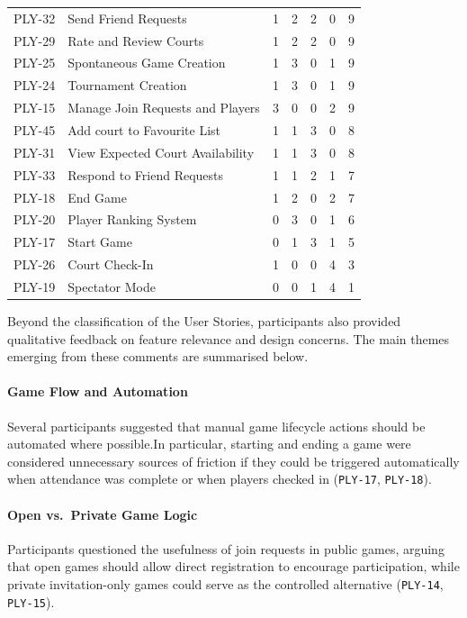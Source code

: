 \begin{table}[htbp]
{\begin{tabular}{|l|p{4.3cm}|c|c|c|c|c|}
			PLY-32 & Send Friend Requests & 1 & 2 & 2 & 0 & 9 \\
			PLY-29 & Rate and Review Courts & 1 & 2 & 2 & 0 & 9 \\
			PLY-25 & Spontaneous Game Creation & 1 & 3 & 0 & 1 & 9 \\
			PLY-24 & Tournament Creation & 1 & 3 & 0 & 1 & 9 \\
			PLY-15 & Manage Join Requests and Players & 3 & 0 & 0 & 2 & 9 \\
			PLY-45 & Add court to Favourite List & 1 & 1 & 3 & 0 & 8 \\
			PLY-31 & View Expected Court Availability & 1 & 1 & 3 & 0 & 8 \\
			PLY-33 & Respond to Friend Requests & 1 & 1 & 2 & 1 & 7 \\
			PLY-18 & End Game & 1 & 2 & 0 & 2 & 7 \\
			PLY-20 & Player Ranking System & 0 & 3 & 0 & 1 & 6 \\
			PLY-17 & Start Game & 0 & 1 & 3 & 1 & 5 \\
			PLY-26 & Court Check-In & 1 & 0 & 0 & 4 & 3 \\
			PLY-19 & Spectator Mode & 0 & 0 & 1 & 4 & 1 \\
			\hline
		\end{tabular}%
	}
\end{table}

Beyond the classification of the User Stories, participants also provided qualitative feedback on feature relevance and design concerns. 
The main themes emerging from these comments are summarised below.

\paragraph{Game Flow and Automation}
Several participants suggested that manual game lifecycle actions should be automated where possible.In particular, starting and ending a game were considered unnecessary sources of friction if they could be triggered automatically when attendance was complete or when players checked in (\texttt{PLY-17}, \texttt{PLY-18}).

\paragraph{Open vs.\ Private Game Logic}
Participants questioned the usefulness of join requests in public games, arguing that open games should allow direct registration to encourage participation, while private invitation-only games could serve as the controlled alternative (\texttt{PLY-14}, \texttt{PLY-15}).

